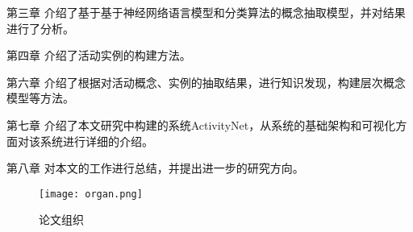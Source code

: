 {\heiti 第三章} 介绍了基于基于神经网络语言模型和分类算法的概念抽取模型，并对结果进行了分析。

{\heiti 第四章} 介绍了活动实例的构建方法。

{\heiti 第六章} 介绍了根据对活动概念、实例的抽取结果，进行知识发现，构建层次概念模型等方法。

{\heiti 第七章} 介绍了本文研究中构建的系统ActivityNet，从系统的基础架构和可视化方面对该系统进行详细的介绍。

{\heiti 第八章} 对本文的工作进行总结，并提出进一步的研究方向。

\begin{figure}[!h]
\caption{论文组织}
\label{fig:organ}
\begin{center}
\texttt{[image: organ.png]}
\end{center}
\end{figure}

